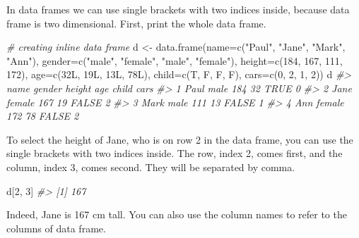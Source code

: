 \documentclass[
]{book}
\newenvironment{Shaded}{\begin{snugshade}}{\end{snugshade}}
\newcommand{\AttributeTok}[1]{\textcolor[rgb]{0.77,0.63,0.00}{#1}}
\newcommand{\CommentTok}[1]{\textcolor[rgb]{0.56,0.35,0.01}{\textit{#1}}}
\newcommand{\DecValTok}[1]{\textcolor[rgb]{0.00,0.00,0.81}{#1}}
\newcommand{\FunctionTok}[1]{\textcolor[rgb]{0.00,0.00,0.00}{#1}}
\newcommand{\NormalTok}[1]{#1}
\newcommand{\OtherTok}[1]{\textcolor[rgb]{0.56,0.35,0.01}{#1}}
\newcommand{\StringTok}[1]{\textcolor[rgb]{0.31,0.60,0.02}{#1}}
\begin{document}
In data frames we can use single brackets with two indices inside, because data frame is two dimensional. First, print the whole data frame.

\begin{Shaded}
\begin{Highlighting}[]
\CommentTok{\# creating inline data frame}
\NormalTok{d }\OtherTok{\textless{}{-}} \FunctionTok{data.frame}\NormalTok{(}\AttributeTok{name=}\FunctionTok{c}\NormalTok{(}\StringTok{"Paul"}\NormalTok{, }\StringTok{"Jane"}\NormalTok{, }\StringTok{"Mark"}\NormalTok{, }\StringTok{"Ann"}\NormalTok{), }
                \AttributeTok{gender=}\FunctionTok{c}\NormalTok{(}\StringTok{"male"}\NormalTok{, }\StringTok{"female"}\NormalTok{, }\StringTok{"male"}\NormalTok{, }\StringTok{"female"}\NormalTok{),}
                \AttributeTok{height=}\FunctionTok{c}\NormalTok{(}\DecValTok{184}\NormalTok{, }\DecValTok{167}\NormalTok{, }\DecValTok{111}\NormalTok{, }\DecValTok{172}\NormalTok{), }
                \AttributeTok{age=}\FunctionTok{c}\NormalTok{(32L, 19L, 13L, 78L), }
                \AttributeTok{child=}\FunctionTok{c}\NormalTok{(T, F, F, F), }
                \AttributeTok{cars=}\FunctionTok{c}\NormalTok{(}\DecValTok{0}\NormalTok{, }\DecValTok{2}\NormalTok{, }\DecValTok{1}\NormalTok{, }\DecValTok{2}\NormalTok{))}
\NormalTok{d}
\CommentTok{\#\textgreater{}   name gender height age child cars}
\CommentTok{\#\textgreater{} 1 Paul   male    184  32  TRUE    0}
\CommentTok{\#\textgreater{} 2 Jane female    167  19 FALSE    2}
\CommentTok{\#\textgreater{} 3 Mark   male    111  13 FALSE    1}
\CommentTok{\#\textgreater{} 4  Ann female    172  78 FALSE    2}
\end{Highlighting}
\end{Shaded}

To select the height of Jane, who is on row 2 in the data frame, you can use the single brackets with two indices inside. The row, index 2, comes first, and the column, index 3, comes second. They will be separated by comma.

\begin{Shaded}
\begin{Highlighting}[]
\NormalTok{d[}\DecValTok{2}\NormalTok{, }\DecValTok{3}\NormalTok{]}
\CommentTok{\#\textgreater{} [1] 167}
\end{Highlighting}
\end{Shaded}

Indeed, Jane is 167 cm tall. You can also use the column names to refer to the columns of data frame.
\end{document}
